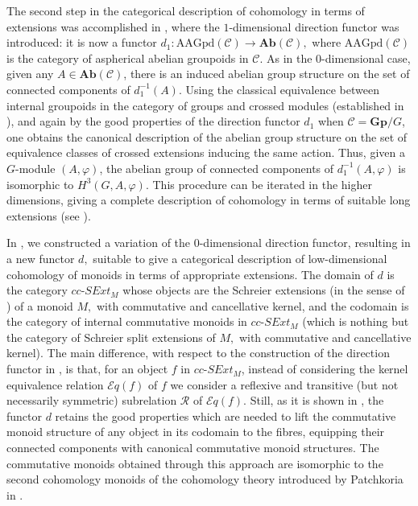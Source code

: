 \documentclass[a4paper]{amsart}
\theoremstyle{plain}
\theoremstyle{definition}
\theoremstyle{remark}
\begin{document}
The second step in the categorical description of cohomology in terms of extensions was accomplished in \cite{aspherical}, where the $1$-dimensional direction functor was introduced: it is now a functor $d_1\colon \mathrm{AAGpd}(\mathcal{C})\to\mathbf{Ab}(\mathcal{C}),$ where $\mathrm{AAGpd}(\mathcal{C})$ is the category of aspherical abelian groupoids in $\mathcal{C}.$ As in the 0-dimensional case, given any $A\in \mathbf{Ab}(\mathcal{C})$, there is an induced abelian group structure on the set of connected components of $d_1^{-1}(A)$. Using the classical equivalence between internal groupoids in the category of groups and crossed modules (established in \cite{BS}), and again by the good properties of the direction functor $d_1$ when $\mathcal{C}=\mathbf{Gp}/G$, one obtains the canonical description of the abelian group structure on the set of equivalence classes of crossed extensions inducing the same action. Thus, given a $G$-module $(A,\varphi)$, the abelian group of connected components of $d_1^{-1}(A,\varphi)$ is isomorphic to $H^3(G,A,\varphi)$. This procedure can be iterated in the higher dimensions, giving a complete description of cohomology in terms of suitable long extensions (see \cite{Bourn-Rodelo}).

In \cite{AMR}, we constructed a variation of the $0$-dimensional direction functor, resulting in a new functor $d,$ suitable to give a categorical description of low-dimensional cohomology of monoids in terms of appropriate extensions. The domain of $d$ is the category $cc\text{-}SExt_M$ whose objects are the Schreier extensions (in the sense of \cite{Redei}) of a monoid $M,$ with commutative and cancellative kernel, and the codomain is the category of internal commutative monoids in $cc\text{-}SExt_M$ (which is nothing but the category of Schreier split extensions of $M,$ with commutative and cancellative kernel). The main difference, with respect to the construction of the direction functor in \cite{bourn-direction}, is that, for an object $f$ in $cc\text{-}SExt_M$, instead of considering the kernel equivalence relation $\mathcal{E}q(f)$ of $f$ we consider a reflexive and transitive (but not necessarily symmetric) subrelation $\mathcal{R}$ of $\mathcal{E}q(f)$. Still, as it is shown in \cite{AMR}, the functor $d$ retains the good properties which are needed to lift the commutative monoid structure of any object in its codomain to the fibres, equipping their connected components with canonical commutative monoid structures. The commutative monoids obtained through this approach are isomorphic to the second cohomology monoids of the cohomology theory introduced by Patchkoria in \cite{Patchkoria77}.
\end{document}
